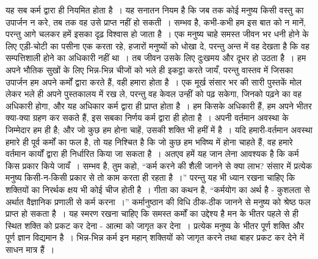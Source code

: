 यह सब कर्म द्वारा ही नियमित होता है~। यह सनातन नियम है कि जब तक कोई मनुष्य किसी वस्तु का उपार्जन न करे, तब तक वह उसे प्राप्त नहीं हो सकती~। सम्भव है, कभी-कभी हम इस बात को न मानें, परन्तु आगे चलकर हमें इसका दृढ़ विश्वास हो जाता है~। एक मनुष्य चाहे समस्त जीवन भर धनी होने के लिए एड़ी-चोटी का पसीना एक करता रहे, हजारों मनुष्यों को धोखा दे, परन्तु अन्त में वह देखता है कि वह सम्पत्तिशाली होने का अधिकारी नहीं था~। तब जीवन उसके लिए दुःखमय और दूभर हो उठता है~। हम अपने भौतिक सुखों के लिए भिन्न-भिन्न चीजों को भले ही इकट्ठा करते जायँ, परन्तु वास्तव में जिसका उपार्जन हम अपने कर्मों द्वारा करते हैं, वही हमारा होता है~। एक मूर्ख संसार भर की सारी पुस्तकें मोल लेकर भले ही अपने पुस्तकालय में रख ले, परन्तु वह केवल उन्हीं को पढ़ सकेगा, जिनको पढ़ने का वह अधिकारी होगा, और यह अधिकार कर्म द्वारा ही प्राप्त होता है~। हम किसके अधिकारी हैं, हम अपने भीतर क्या-क्या ग्रहण कर सकते हैं, इस सबका निर्णय कर्म द्वारा ही होता है~। अपनी वर्तमान अवस्था के जिम्मेदार हम ही है; और जो कुछ हम होना चाहें, उसकी शक्ति भी हमीं में है~। यदि हमारी-वर्तमान अवस्था हमारे ही पूर्व कर्मों का फल है, तो यह निश्चित है कि जो कुछ हम भविष्य में होना चाहते हैं, वह हमारे वर्तमान कार्यों द्वारा ही निर्धारित किया जा सकता है~। अतएव हमें यह जान लेना आवश्यक है कि कर्म किस प्रकार किये जायँ~। सम्भव है, तुम कहो, “कर्म करने की शैली जानने से क्या लाभ? संसार में प्रत्येक मनुष्य किसी-न-किसी प्रकार से तो काम करता ही रहता है~।” परन्तु यह भी ध्यान रखना चाहिए कि शक्तियों का निरर्थक क्षय भी कोई चीज होती है~। गीता का कथन है, “कर्मयोग का अर्थ है - कुशलता से अर्थात वैज्ञानिक प्रणाली से कर्म करना~।” कर्मानुष्ठान की विधि ठीक-ठीक जानने से मनुष्य को श्रेष्ठ फल प्राप्त हो सकता है~। यह स्मरण रखना चाहिए कि समस्त कर्मों का उद्देश्य है मन के भीतर पहले से ही स्थित शक्ति को प्रकट कर देना - आत्मा को जागृत कर देना~। प्रत्येक मनुष्य के भीतर पूर्ण शक्ति और पूर्ण ज्ञान विद्यमान है~। भिन्न-भिन्न कर्म इन महान् शक्तियों को जागृत करने तथा बाहर प्रकट कर देने में साधन मात्र हैं~।

